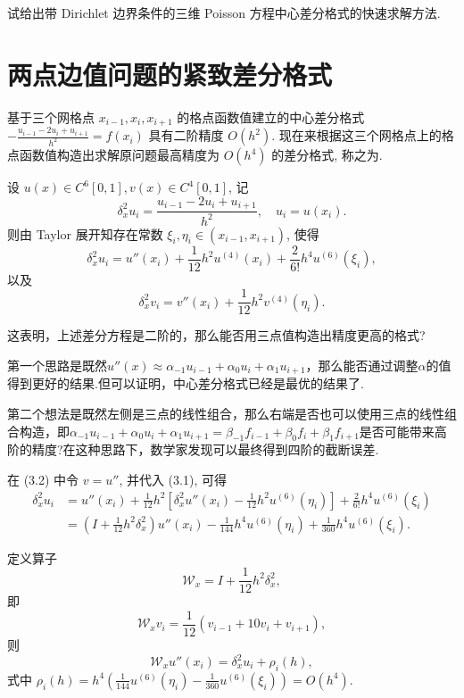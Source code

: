 \begin{question}
    试给出带 Dirichlet 边界条件的三维 Poisson 方程中心差分格式的快速求解方法.
\end{question}

\section{两点边值问题的紧致差分格式}

基于三个网格点 $x_{i-1}, x_i, x_{i+1}$ 的格点函数值建立的中心差分格式 $-\frac{u_{i-1}-2u_i+u_{i+1}}{h^2} = f(x_i)$ 具有二阶精度 $O(h^2)$. 现在来根据这三个网格点上的格点函数值构造出求解原问题最高精度为 $O(h^4)$ 的差分格式, 称之为.

设 $u(x) \in C^6[0, 1], v(x) \in C^4[0, 1]$, 记
\[ \delta_x^2 u_i = \frac{u_{i-1} - 2u_i + u_{i+1}}{h^2}, \quad u_i = u(x_i). \]
则由 Taylor 展开知存在常数 $\xi_i, \eta_i \in (x_{i-1}, x_{i+1})$, 使得
\begin{equation}
    \delta_x^2 u_i = u''(x_i) + \frac{1}{12}h^2 u^{(4)}(x_i) + \frac{2}{6!}h^4 u^{(6)}(\xi_i), 
\end{equation}
以及
\begin{equation}
    \delta_x^2 v_i = v''(x_i) + \frac{1}{12}h^2 v^{(4)}(\eta_i). 
\end{equation}\par
这表明，上述差分方程是二阶的，那么能否用三点值构造出精度更高的格式?\par
第一个思路是既然$u''(x)\approx \alpha_{-1}u_{i-1}+\alpha_0u_i+\alpha_1u_{i+1}$，那么能否通过调整$\alpha$的值得到更好的结果.但可以证明，中心差分格式已经是最优的结果了.\par
第二个想法是既然左侧是三点的线性组合，那么右端是否也可以使用三点的线性组合构造，即$\alpha_{-1}u_{i-1}+\alpha_0u_i+\alpha_1u_{i+1}=\beta_{-1}f_{i-1}+\beta_0f_i+\beta_1f_{i+1}$是否可能带来高阶的精度?在这种思路下，数学家发现可以最终得到四阶的截断误差.

在 (3.2) 中令 $v = u''$, 并代入 (3.1), 可得
\begin{align*}
    \delta_x^2 u_i &= u''(x_i) + \frac{1}{12}h^2 \left[ \delta_x^2 u''(x_i) - \frac{1}{12}h^2 u^{(6)}(\eta_i) \right] + \frac{2}{6!}h^4 u^{(6)}(\xi_i) \\
    &= \left( I + \frac{1}{12}h^2 \delta_x^2 \right) u''(x_i) - \frac{1}{144}h^4 u^{(6)}(\eta_i) + \frac{1}{360}h^4 u^{(6)}(\xi_i).
\end{align*}

定义算子
\begin{equation}
    \mathcal{W}_x = I + \frac{1}{12}h^2 \delta_x^2,
\end{equation}
即
\begin{equation}
    \mathcal{W}_x v_i = \frac{1}{12}(v_{i-1} + 10v_i + v_{i+1}), 
\end{equation}
则
\begin{equation}
    \mathcal{W}_x u''(x_i) = \delta_x^2 u_i + \rho_i(h), 
\end{equation}
式中 $\rho_i(h) = h^4 \left( \frac{1}{144}u^{(6)}(\eta_i) - \frac{1}{360}u^{(6)}(\xi_i) \right) = O(h^4).$

